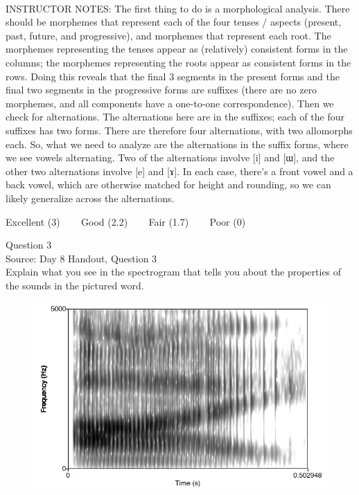 \documentclass[12pt]{article}
\begin{document}
~\\
INSTRUCTOR NOTES: The first thing to do is a morphological analysis. There should be morphemes that represent each of the four tenses / aspects (present, past, future, and progressive), and morphemes that represent each root. The morphemes representing the tenses appear as (relatively) consistent forms in the columns; the morphemes representing the roots appear as consistent forms in the rows. Doing this reveals that the final 3 segments in the present forms and the final two segments in the progressive forms are suffixes (there are no zero morphemes, and all components have a one-to-one correspondence). Then we check for alternations. The alternations here are in the suffixes; each of the four suffixes has two forms. There are therefore four alternations, with two allomorphs each. So, what we need to analyze are the alternations in the suffix forms, where we see vowels alternating. Two of the alternations involve [i] and [ɯ], and the other two alternations involve [e] and [ɤ]. In each case, there’s a front vowel and a back vowel, which are otherwise matched for height and rounding, so we can likely generalize across the alternations.


\vfill
Excellent (3) ~~~ Good (2.2) ~~~ Fair (1.7) ~~~ Poor (0)
\newpage

{\large Question 3}\\

Source: Day 8 Handout, Question 3\\

Explain what you see in the spectrogram that tells you about the properties of the sounds in the pictured word.\\

\begin{figure}[H]
\includegraphics{../images/spectrogram_I.png}
\end{figure}
\end{document}
